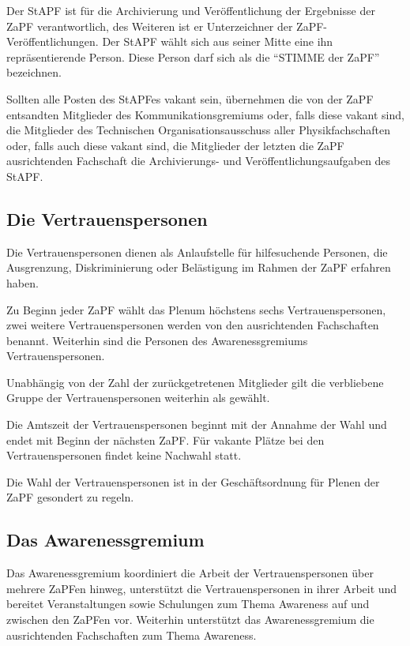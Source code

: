 \documentclass[
  a4paper,
  oneside]{scrartcl}
\begin{document}
Der StAPF ist für die Archivierung und Veröffentlichung der Ergebnisse
der ZaPF verantwortlich, des Weiteren ist er Unterzeichner der
ZaPF-Veröffentlichungen. Der StAPF wählt sich aus seiner Mitte eine ihn
repräsentierende Person. Diese Person darf sich als die ``STIMME der
ZaPF'' bezeichnen.

Sollten alle Posten des StAPFes vakant sein, übernehmen die von der ZaPF
entsandten Mitglieder des Kommunikationsgremiums oder, falls diese
vakant sind, die Mitglieder des Technischen Organisationsausschuss aller
Physikfachschaften oder, falls auch diese vakant sind, die Mitglieder
der letzten die ZaPF ausrichtenden Fachschaft die Archivierungs- und
Veröffentlichungsaufgaben des StAPF.

\subsection{Die Vertrauenspersonen}\label{die-vertrauenspersonen}

Die Vertrauenspersonen dienen als Anlaufstelle für hilfesuchende
Personen, die Ausgrenzung, Diskriminierung oder Belästigung im Rahmen
der ZaPF erfahren haben.

Zu Beginn jeder ZaPF wählt das Plenum höchstens sechs
Vertrauenspersonen, zwei weitere Vertrauenspersonen werden von den
ausrichtenden Fachschaften benannt. Weiterhin sind die Personen des
Awarenessgremiums Vertrauenspersonen.

Unabhängig von der Zahl der zurückgetretenen Mitglieder gilt die
verbliebene Gruppe der Vertrauenspersonen weiterhin als gewählt.

Die Amtszeit der Vertrauenspersonen beginnt mit der Annahme der Wahl und
endet mit Beginn der nächsten ZaPF. Für vakante Plätze bei den
Vertrauenspersonen findet keine Nachwahl statt.

Die Wahl der Vertrauenspersonen ist in der Geschäftsordnung für Plenen
der ZaPF gesondert zu regeln.

\subsection{Das Awarenessgremium}\label{das-awarenessgremium}

Das Awarenessgremium koordiniert die Arbeit der Vertrauenspersonen über
mehrere ZaPFen hinweg, unterstützt die Vertrauenspersonen in ihrer
Arbeit und bereitet Veranstaltungen sowie Schulungen zum Thema Awareness
auf und zwischen den ZaPFen vor. Weiterhin unterstützt das
Awarenessgremium die ausrichtenden Fachschaften zum Thema Awareness.
\end{document}
